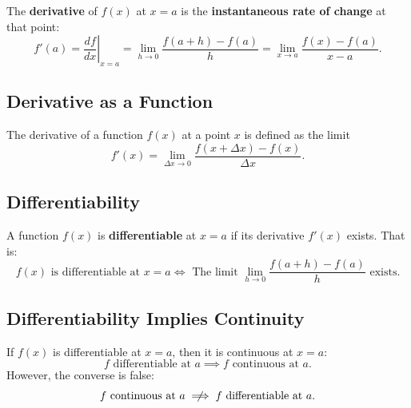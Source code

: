 \documentclass[a4paper,11pt]{article}
\begin{document}
\begin{tcolorbox}
    The \textbf{derivative} of \( f(x) \) at \( x = a \) is the \textbf{instantaneous rate of change} at that point:
    \[
    f'(a) = \left. \frac{df}{dx} \right|_{x=a} =\lim\limits_{h \to 0} \frac{f(a + h) - f(a)}{h} = \lim\limits_{x \to a} \frac{f(x) - f(a)}{x - a}.
    \]
\end{tcolorbox}




\subsection{Derivative as a Function}

\begin{tcolorbox}
    The derivative of a function \( f(x) \) at a point \( x \) is defined as the limit
    \[
    f'(x) = \lim_{\Delta x \to 0} \frac{f(x + \Delta x) - f(x)}{\Delta x}.
    \]
\end{tcolorbox}




\subsection{Differentiability}

\begin{tcolorbox}
    A function \( f(x) \) is \textbf{differentiable} at \( x = a \) if its derivative \( f'(x) \) exists. That is:  
    \[
    f(x) \text{ is differentiable at } x = a \iff \text{ The limit } \lim\limits_{h \to 0} \frac{f(a+h) - f(a)}{h} \text{ exists.}
    \]
\end{tcolorbox}




\subsection{Differentiability Implies Continuity}

\begin{tcolorbox}
    If \( f(x) \) is differentiable at \( x = a \), then it is continuous at \( x = a: \)
    \[
    f \text{ differentiable at } a \implies f \text{ continuous at } a.
    \]
    However, the converse is false:
    \[
    f \text{ continuous at } a \centernot\implies f \text{ differentiable at } a.
    \]
\end{tcolorbox}


\end{document}
